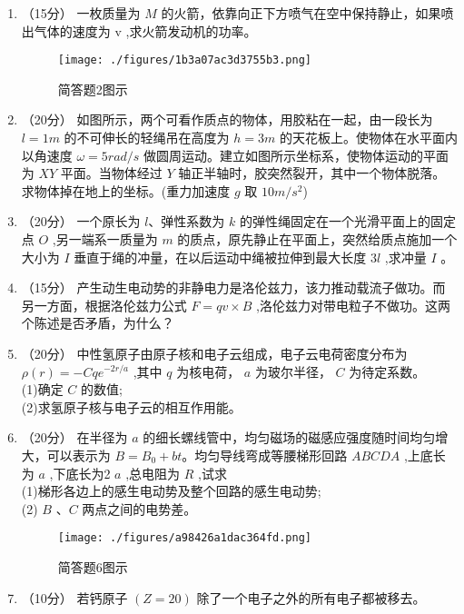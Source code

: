 

\begin{enumerate}
\item （15分）
一枚质量为 $M$ 的火箭，依靠向正下方喷气在空中保持静止，如果喷出气体的速度为  $\mathrm v$ ,求火箭发动机的功率。\\
\begin{figure}[ht]
\centering
\texttt{[image: ./figures/1b3a07ac3d3755b3.png]}
\caption{简答题2图示} \label{fig_USTC15_1}
\end{figure}
\item （20分）
如图所示，两个可看作质点的物体，用胶粘在一起，由一段长为 $l=1m$ 的不可伸长的轻绳吊在高度为 $h=3m$ 的天花板上。使物体在水平面内以角速度 $\omega=5rad/s$ 做圆周运动。建立如图所示坐标系，使物体运动的平面为 $XY$ 平面。当物体经过 $Y$ 轴正半轴时，胶突然裂开，其中一个物体脱落。求物体掉在地上的坐标。(重力加速度 $g$ 取 $10m/s^2$)
\item （20分）
一个原长为 $l$、弹性系数为 $k$ 的弹性绳固定在一个光滑平面上的固定点 $O$ ,另一端系一质量为 $m$ 的质点，原先静止在平面上，突然给质点施加一个大小为 $I$ 垂直于绳的冲量，在以后运动中绳被拉伸到最大长度 3$l$ ,求冲量 $I$ 。
\item （15分）
产生动生电动势的非静电力是洛伦兹力，该力推动载流子做功。而另一方面，根据洛伦兹力公式 $F=qv\times B$ ,洛伦兹力对带电粒子不做功。这两个陈述是否矛盾，为什么？
\item （20分）
中性氢原子由原子核和电子云组成，电子云电荷密度分布为 $\rho(r)=-Cqe^{-2r/a}$ ,其中 $q$ 为核电荷， $a$ 为玻尔半径， $C$ 为待定系数。\\
(1)确定 $C$ 的数值;\\
(2)求氢原子核与电子云的相互作用能。
\item （20分）
在半径为 $a$ 的细长螺线管中，均匀磁场的磁感应强度随时间均匀增大，可以表示为 $B=B_0+bt$。均匀导线弯成等腰梯形回路 $ABCDA$ ,上底长为 $a$ ,下底长为2 $a$ ,总电阻为 $R$ ,试求\\
(1)梯形各边上的感生电动势及整个回路的感生电动势;\\
(2) $B$ 、$C$ 两点之间的电势差。\\
\begin{figure}[ht]
\centering
\texttt{[image: ./figures/a98426a1dac364fd.png]}
\caption{简答题6图示} \label{fig_USTC15_2}
\end{figure}
\item （10分）
若钙原子 $(Z=20)$ 除了一个电子之外的所有电子都被移去。\\

\end{enumerate}
